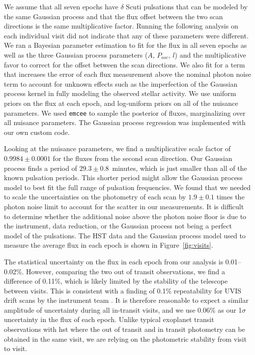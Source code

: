 \documentclass[longauth]{aa} %
\begin{document}
We assume that all seven epochs have $\delta$ Scuti pulsations that can be modeled by the same Gaussian process and that the flux offset between the two scan directions is the same multiplicative factor.
%
Running the following analysis on each individual visit did not indicate that any of these parameters were different.
%
We ran a Bayesian parameter estimation to fit for the flux in all seven epochs as well as the three Gaussian process parameters ($A$, $P_{osc}$, $l$) and the multiplicative favor to correct for the offset between the scan directions.
%
We also fit for a term that increases the error of each flux measurement above the nominal photon noise term to account for unknown effects such as the imperfection of the Gaussian process kernel in fully modeling the observed stellar activity.
%
We use uniform priors on the flux at each epoch, and log-uniform priors on all of the nuisance parameters.
%
We used \texttt{emcee} \citep{ForemanMackey13} to sample the posterior of fluxes, marginalizing over all nuisance parameters.
%
The Gaussian process regression was implemented with our own custom code.

Looking at the nuisance parameters, we find a multiplicative scale factor of $0.9984 \pm 0.0001$ for the fluxes from the second scan direction.
%
Our Gaussian process finds a period of $29.3 \pm 0.8$~minutes, which is just smaller than all of the known pulsation periods.
%
This shorter period might allow the Gaussian process model to best fit the full range of pulsation frequencies.
%
We found that we needed to scale the uncertainties on the photometry of each scan by $1.9 \pm 0.1$ times the photon noise limit to account for the scatter in our measurements.
%
It is difficult to determine whether the additional noise above the photon noise floor is due to the instrument, data reduction, or the Gaussian process not being a perfect model of the pulsations.
%
The HST data and the Gaussian process model used to measure the average flux in each epoch is shown in Figure~\ref{fig:visits}.

The statistical uncertainty on the flux in each epoch from our analysis is 0.01--0.02\%.
%
However, comparing the two out of transit observations, we find a difference of 0.11\%, which is likely limited by the stability of the telescope between visits.
%
This is consistent with a finding of 0.1\%  repeatability for UVIS drift scans by the instrument team \citep[Instrument Science Report WFC3 2017-21;][]{Shanahan2019}.
%
It is therefore reasonable to expect a similar amplitude of uncertainty during all in-transit visits, and we use 0.06\% as our 1$\sigma$ uncertainty in the flux of each epoch.
%
Unlike typical exoplanet transit observations with \ac{hst} where the out of transit and in transit photometry can be obtained in the same visit, we are relying on the photometric stability from visit to visit.
\end{document}
